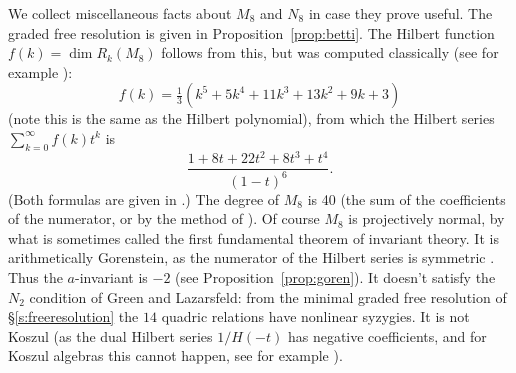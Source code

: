\documentclass{amsart}
\newcommand{\cut}[1]{}
\theoremstyle{definition}
\theoremstyle{remark}
\begin{document}
We collect miscellaneous facts about $M_8$ and $N_8$ in case they
prove useful.  The graded free resolution is given in
Proposition~\ref{prop:betti}.\cut{[put it here; gradedness appears to
  be new; F-SM don't do this --- Ben said Jul 13 that F-SM undoubtedly
  had this, but didn't publish it].}  The Hilbert function $f(k) =
\dim{R_k(M_8)}$ follows from this, but was computed classically (see
for example \cite[p.~155, \S 5.4.2.3]{howe}):
\begin{displaymath}
f(k) = \tfrac{1}{3} \left(  k^5 + 5  k^4 + 11 k^3+ 13 k^2+9k+3 \right)
\end{displaymath}
(note this is the same as the Hilbert polynomial),
from which the Hilbert series $\sum_{k=0}^\infty f(k) t^k$ is 
\begin{equation}
\label{howenowe}
\frac{1+8t+22t^2+8t^3+t^4}{(1-t)^6}.
\end{equation}
(Both formulas are given in \cite[p.~7]{fs}.)  The degree of
$M_8$ is 40 (the sum of the coefficients of the numerator, or by the
method of \cite[p. 190]{hmsv1}).
Of course $M_8$ is projectively normal, by what is sometimes called the first fundamental
theorem of invariant theory.  It is arithmetically Gorenstein, as the
numerator
of the Hilbert series is symmetric
\cite[Corollary~4.4.6]{BrunsHerzog}.
Thus the $a$-invariant is
$-2$  (see Proposition~\ref{prop:goren}).
   It doesn't satisfy the $N_2$ condition
of Green and Lazarsfeld:  from the minimal graded free
resolution of \S \ref{s:freeresolution}  the $14$ quadric relations have
nonlinear syzygies.
It  is not Koszul (as the dual Hilbert series $1/H(-t)$ has negative
coefficients, and for Koszul algebras this cannot happen, see for
example \cite[equ.\ (1)]{p}).
\end{document}
